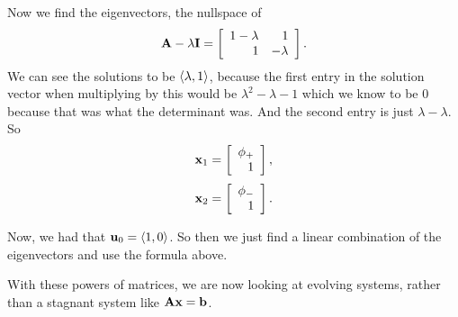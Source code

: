 Now we find the eigenvectors, the nullspace of
\[ \mA-\lambda\mI = \mat{1-\lambda&1\\1&-\lambda}. \]
We can see the solutions to be $\rvec{\lambda,1}$, because the first entry in the solution vector when multiplying by this would be $\lambda^2-\lambda-1$ which we know to be 0 because that was what the determinant was. And the second entry is just $\lambda-\lambda$. So
\[ \vx_1 = \mat{\phi_+\\1}, \]
\[ \vx_2 = \mat{\phi_-\\1}. \]

Now, we had that $\vu_0 = \rvec{1,0}$. So then we just find a linear combination of the eigenvectors and use the formula above. 
\eex 

\brm 
With these powers of matrices, we are now looking at evolving systems, rather than a stagnant system like $\mA\vx = \vb$. 
\erm
